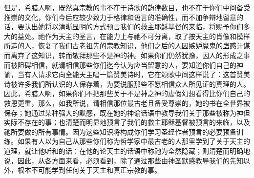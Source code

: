 但是，希腊人啊，既然真宗教的事不在于诗歌的韵律数目，也不在于你们中间备受推崇的文化，你们今后应较少致力于格律和语言的准确性，而不加争辩地留意的话，要认出她将以清晰显明的方式预言我们的救主耶稣基督的来临，将赐予你们多大的益处。祂作为天主的圣言，在能力上与祂不可分离，取了按天主的肖像和模样所造的人，恢复了我们古老祖先的宗教知识，他们之后的人因嫉妒魔鬼的蛊惑计谋而离弃了这知识，转而敬拜那些不是神的神。如果你们仍然犹豫，因人的形成之事而被阻碍相信，就请相信那些你们迄今认为应当留意的人，要知道你们自己的神谕，当有人请求它向全能天主唱一篇赞美诗时，它在颂歌中间这样说了：这首赞美诗被许多我们所认识的人保存着，为要说服那些不愿相信众人所见证的真理的人。因此，希腊人啊，如果你们不把那些关于不是神之神的虚假幻想看得比你们自己的救恩更重，那么，如我所说，请相信那位最古老且备受尊崇的，她的书在全世界被保存；她通过某种强大的默感，既在她的神谕话语中教导我们关于那些被称为神但实际不存在的事；也清楚而明显地预言了我们的救主耶稣基督被预言的来临，以及祂所要做的所有事情。因为这些知识将构成你们学习圣经作者预言的必要预备训练。如果有人以为自己从那些你们称为哲学家中最古老的人那里学到了关于天主的道理，就让他听和的话：在他的论天主的话语中称祂为全然隐藏；则清楚而明确地说，因此，从各方面来看，必须看到，除了通过那些由神圣默感教导我们的先知以外，根本不可能学到任何关于天主和真正宗教的事。\par


